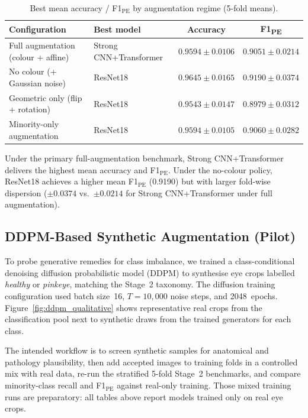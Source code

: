 \documentclass[10pt,journal,compsoc]{IEEEtran}
\begin{document}
\begin{table}[t]
  \caption{Best mean accuracy / F1$_{\mathrm{PE}}$ by augmentation
    regime (5-fold means).}
  \label{tab:full_comparison}
  \centering
  \begin{tabular}{llcc}
    \toprule
    \textbf{Configuration}
      & \textbf{Best model}
      & \textbf{Accuracy}
      & \textbf{F1\textsubscript{PE}} \\
    \midrule
    Full augmentation (colour + affine)
      & Strong CNN+Transformer
      & $0.9594 \pm 0.0106$
      & $0.9051 \pm 0.0214$ \\
    No colour (+ Gaussian noise)
      & ResNet18
      & $0.9645 \pm 0.0165$
      & $0.9190 \pm 0.0374$ \\
    Geometric only (flip + rotation)
      & ResNet18
      & $0.9543 \pm 0.0147$
      & $0.8979 \pm 0.0312$ \\
    Minority-only augmentation
      & ResNet18
      & $0.9594 \pm 0.0105$
      & $0.9060 \pm 0.0282$ \\
    \bottomrule
  \end{tabular}
\end{table}

Under the primary full-augmentation benchmark, Strong CNN+Transformer
delivers the highest mean accuracy and F1$_{\mathrm{PE}}$. Under the
no-colour policy, ResNet18 achieves a higher mean F1$_{\mathrm{PE}}$
(0.9190) but with larger fold-wise dispersion ($\pm 0.0374$ vs.\
$\pm 0.0214$ for Strong CNN+Transformer under full augmentation).

\subsection{DDPM-Based Synthetic Augmentation (Pilot)}
\label{subsec:ddpm_pilot}

To probe generative remedies for class imbalance, we trained a
class-conditional denoising diffusion probabilistic model (DDPM)
\cite{ho2020ddpm} to synthesise eye crops labelled \emph{healthy} or
\emph{pinkeye}, matching the Stage~2 taxonomy. The diffusion training
configuration used batch size~16, $T{=}10{,}000$ noise steps, and
2048~epochs. Figure~\ref{fig:ddpm_qualitative} shows representative
real crops from the classification pool next to synthetic draws from the
trained generators for each class.

The intended workflow is to screen synthetic samples for anatomical and
pathology plausibility, then add accepted images to training folds in a
controlled mix with real data, re-run the stratified 5-fold Stage~2
benchmarks, and compare minority-class recall and F1$_{\mathrm{PE}}$
against real-only training. Those mixed training runs are preparatory:
all tables above report models trained only on real eye crops.
\end{document}
